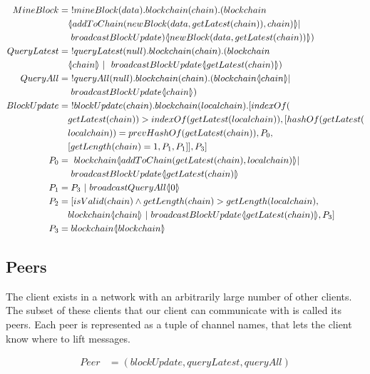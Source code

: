 \begin{align*}
    MineBlock &=\ !mineBlock(data).blockchain(chain).(blockchain\\
        &\quad \lift{}{addToChain(newBlock(data,getLatest(chain)),chain)}|\\
        &\quad \ broadcastBlockUpdate)\lift{}{newBlock(data, getLatest(chain))})\\
    QueryLatest &=\ !queryLatest(null).blockchain(chain).(blockchain\\
        &\quad \lift{}{chain}\ |\ \ broadcastBlockUpdate\lift{}{getLatest(chain)})\\
        QueryAll &=\ !queryAll(null).blockchain(chain).(blockchain\lift{}{chain}|\\
        &\quad \ broadcastBlockUpdate\lift{}{chain})\\
    BlockUpdate &=\ !blockUpdate(chain).blockchain(localchain).[indexOf(\\
        &\quad getLatest(chain))>indexOf(getLatest(localchain)),[hashOf(getLatest(\\
        &\quad localchain))=prevHashOf(getLatest(chain)),P_0,\\
        &\quad [getLength(chain)=1,P_1,P_1]],P_3]\\
    P_0 &=\ blockchain\lift{}{addToChain(getLatest(chain),localchain)}|\\
        &\quad \ broadcastBlockUpdate\lift{}{getLatest(chain)}\\
    P_1 &= P_3\ |\ broadcastQueryAll \lift{}{0}\\
    P_2 &= [isValid(chain) \land getLength(chain) > getLength(localchain),\\
        &\quad blockchain\lift{}{chain}\ |\ broadcastBlockUpdate \lift{}{getLatest(chain)},P_3]\\
    P_3 &= blockchain\lift{}{blockchain}
\end{align*}

\subsection{Peers}
The client exists in a network with an arbitrarily large number of other clients.
The subset of these clients that our client can communicate with is called its peers.
Each peer is represented as a tuple of channel names, that lets the client know where to lift messages.

\begin{align*}
    Peer &= (blockUpdate, queryLatest, queryAll)
\end{align*}

